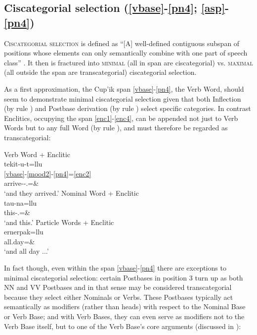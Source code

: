 \documentclass[output=paper]{langscibook}
\begin{document}
\subsection{Ciscategorial selection (\ref{vbase}-\ref{pn4}; \ref{asp}-\ref{pn4})} 
\label{sec:5.5}

\textsc{Ciscategorial} \textsc{selection} is defined as ``[A] well-defined contiguous subspan of positions whose elements can only semantically combine with one part of speech class'' \citep[16]{Tallman2021}. It then is fractured into \textsc{minimal} (all in span are ciscategorial) vs. \textsc{maximal} (all outside the span are transcategorial) ciscategorial selection.

As a first approximation, the Cup'ik span \ref{vbase}-\ref{pn4}, the Verb Word, should seem to demonstrate minimal ciscategorial selection given that both Inflection (by rule ) and Postbase derivation (by rule ) select specific categories. In contrast Enclitics, occupying the span \ref{enc1}-\ref{enc4}, can be appended not just to Verb Words but to any full Word (by rule ), and must therefore be regarded as transcategorial:

\ea\label{ex:key:31}
\ea\label{ex:key:31a}{Verb Word + Enclitic}\\
\glll tekit-u-t=llu\\
    \ref{vbase}-\ref{mood2}-\ref{pn4}=\ref{enc2} \\
     arrive-\Ind{}-\Tpl.\Sarg{}=\& \\
\glt `and they arrived.'
\ex\label{ex:key:31b} {Nominal Word + Enclitic}\\
\gll tau-na=llu\\
     this-\Abs.\Sg{}=\& \\
\glt `and this.'
\ex\label{ex:key:31c} {Particle Words + Enclitic}\\
\gll ernerpak=llu\\
     all.day=\& \\
\glt `and all day ...'
\z
\z

In fact though, even within the span \ref{vbase}-\ref{pn4} there are exceptions to minimal ciscategorial selection: certain Postbases in position 3 turn up as both NN and VV Postbases and in that sense may be considered transcategorial because they select either Nominals or Verbs. These Postbases typically act semantically as modifiers (rather than heads) with respect to the Nominal Base or Verb Base; and with Verb Bases, they can even serve as modifiers not to the Verb Base itself, but to one of the Verb Base's core arguments (discussed in \citealt{Woodbury2017}):
\end{document}
